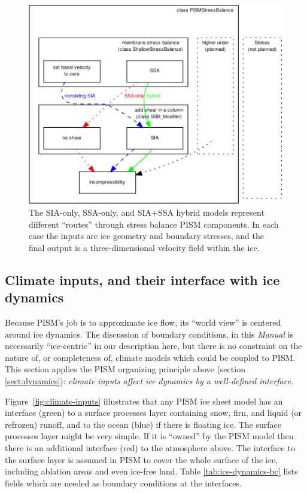 \documentclass[titlepage,letterpaper,final]{scrartcl}
\begin{document}
\begin{figure}
  \centering
  \includegraphics[width=6in]{stressbalance}
  \caption{The SIA-only, SSA-only, and SIA+SSA hybrid models represent different ``routes'' through stress balance PISM components.  In each case the inputs are ice geometry and boundary stresses, and the final output is a three-dimensional velocity field within the ice.}
  \label{fig:stressbalance}
\end{figure}


\subsection{Climate inputs, and their interface with ice dynamics}
\label{sec:climate-inputs}  

Because PISM's job is to approximate ice flow, its ``world view'' is centered around ice dynamics.  The discussion of boundary conditions, in this \emph{Manual} is necessarily ``ice-centric'' in our description here, but there is no constraint on the nature of, or completeness of, climate models which could be coupled to PISM.  This section applies the PISM organizing principle above (section \ref{sect:dynamics}): \emph{climate inputs affect ice dynamics by a well-defined interface}.

Figure~\ref{fig:climate-inputs} illustrates that any PISM ice sheet model has an interface (green) to a surface processes layer containing snow, firn, and liquid (or refrozen) runoff, and to the ocean (blue) if there is floating ice.  The surface processes layer might be very simple.  If it is ``owned'' by the PISM model then there is an additional interface (red) to the atmosphere above.  The interface to the surface layer is assumed in PISM to cover the whole surface of the ice, including ablation areas and even ice-free land.  Table \ref{tab:ice-dynamics-bc} lists fields which are needed as boundary conditions at the interfaces.
\end{document}
